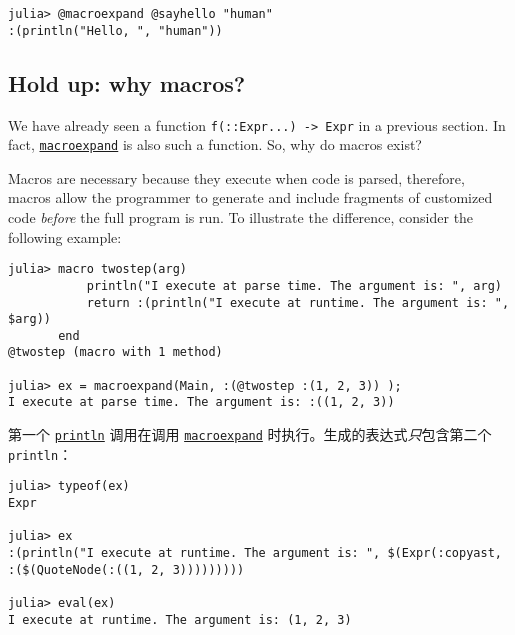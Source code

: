 \begin{verbatim}
julia> @macroexpand @sayhello "human"
:(println("Hello, ", "human"))
\end{verbatim}



\hypertarget{12261577225730588688}{}


\subsection{Hold up: why macros?}



We have already seen a function \texttt{f(::Expr...) -> Expr} in a previous section. In fact, \hyperlink{8018172489611994488}{\texttt{macroexpand}} is also such a function. So, why do macros exist?



Macros are necessary because they execute when code is parsed, therefore, macros allow the programmer to generate and include fragments of customized code \emph{before} the full program is run. To illustrate the difference, consider the following example:




\begin{lstlisting}
julia> macro twostep(arg)
           println("I execute at parse time. The argument is: ", arg)
           return :(println("I execute at runtime. The argument is: ", $arg))
       end
@twostep (macro with 1 method)

julia> ex = macroexpand(Main, :(@twostep :(1, 2, 3)) );
I execute at parse time. The argument is: :((1, 2, 3))
\end{lstlisting}



第一个 \hyperlink{783803254548423222}{\texttt{println}} 调用在调用 \hyperlink{8018172489611994488}{\texttt{macroexpand}} 时执行。生成的表达式\emph{只}包含第二个 \texttt{println}：




\begin{lstlisting}
julia> typeof(ex)
Expr

julia> ex
:(println("I execute at runtime. The argument is: ", $(Expr(:copyast, :($(QuoteNode(:((1, 2, 3)))))))))

julia> eval(ex)
I execute at runtime. The argument is: (1, 2, 3)
\end{lstlisting}



\hypertarget{14488850884072492512}{}


